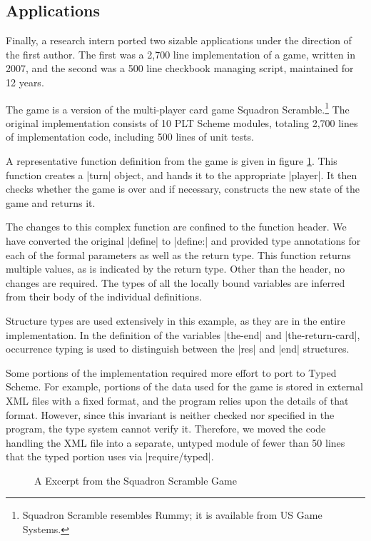 \begin{schemeregion}
\section{Applications}
Finally, a research intern ported two
sizable applications under the direction of the first author.  The
first was a 2,700 line implementation of a game, written in 2007, and
the second was a 500 line checkbook managing script, maintained for
 12 years.

The game is a version of the multi-player card game
Squadron Scramble.\footnote{Squadron Scramble resembles Rummy; it is
available from US Game Systems.}  The original implementation consists of
10 PLT Scheme modules, totaling 2,700 lines of implementation code,
including 500 lines of unit tests.  

A representative function definition from the game is given in figure
\ref{f:squad}.  This function creates a \scheme|turn| object, and hands it
to the appropriate \scheme|player|.  It then checks whether the game is
over and if necessary, constructs the new state of the game and returns it.

The changes to this complex function are confined to
the function header.  We have converted the original \scheme|define|
to \scheme|define:| and provided type annotations for each of the
formal parameters as well as the return type.  This function 
returns multiple values, as is indicated by the return type.  Other
than the header, no changes are required.  The types of all the
locally bound variables are inferred from their body of the individual
definitions.  

Structure types are used extensively in this example, as they are in
the entire implementation.  In the definition of the variables
\scheme|the-end| and \scheme|the-return-card|, occurrence typing is
used to distinguish between the \scheme|res| and \scheme|end|
structures.   

Some portions of the implementation required more effort to port to
Typed Scheme. For example, portions of the data used for the game is stored
in external XML files with a fixed format, and the program relies upon
the details of that format.  However, since this invariant is neither
checked nor specified in the program, the type system cannot verify it.  Therefore,
we moved the code handling the XML file into a separate, untyped module of fewer than 50 lines
that the typed portion uses via \scheme|require/typed|.


\begin{figure}
\caption{A Excerpt from the Squadron Scramble Game}
\label{f:squad}
\end{figure}


\end{schemeregion}
